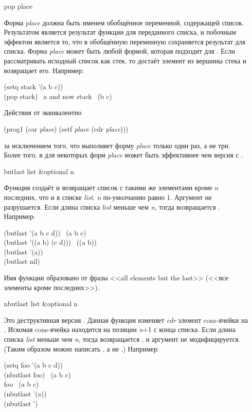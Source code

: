 \begin{defmac}
pop place

Форма \emph{place} должна быть именем обобщённое переменной, содержащей
список. Результатом  является результат  функции для
переданного списка, и побочным эффектом является то, что в обобщённую переменную
сохраняется результат  для списка.
Форма \emph{place} может быть любой формой, которая подходит для
. Если рассматривать исходный список как стек, то  достаёт
элемент из вершины стека и возвращает его.
Например:
\begin{lisp}
(setq stack '(a b c)) \\
(pop stack) \EV\ a  \textrm{and now} stack \EV\ (b c)
\end{lisp}
Действия от  эквивалентно
\begin{lisp}
(prog1 (car \emph{place}) (setf \emph{place} (cdr \emph{place})))
\end{lisp}
за исключением того, что  выполняет форму \emph{place} только один раз,
а не три.
Более того, в для некоторых форм \emph{place}  может быть
эффективнее чем версия с . 
\end{defmac}

\begin{defun}[Функция]
butlast list &optional n

Функция создаёт и возвращает список с такими же элементами кроме \emph{n}
последних, что и в списке \emph{list}.
\emph{n} по-умолчанию равно 1. Аргумент не разрушается.
Если длина списка \emph{list} меньше чем \emph{n}, тогда возвращается
{\emptylist}.
Например:
\begin{lisp}
(butlast '(a b c d)) \EV\ (a b c) \\
(butlast '((a b) (c d))) \EV\ ((a b)) \\
(butlast '(a)) \EV\ {\emptylist} \\
(butlast nil) \EV\ {\emptylist}
\end{lisp}
Имя функции образовано от фразы <<all elements but the last>> (<<все элементы
кроме последних>>).
\end{defun}

\begin{defun}[Функция]
nbutlast list &optional n

Это деструктивная версия . Данная функция изменяет \emph{cdr}
элемент cons-ячейки на {\nil}. Искомая cons-ячейка находится на позиции
\emph{n}+1 с конца списка. Если длина списка \emph{list} меньше чем \emph{n},
тогда возвращается {\emptylist}, и аргумент не модифицируется. (Таким образом
можно написать , а не .)
Например:
\begin{lisp}
(setq foo '(a b c d)) \\
(nbutlast foo) \EV\ (a b c) \\
foo \EV\ (a b c) \\
(nbutlast '(a)) \EV\ {\emptylist} \\
(nbutlast '{\nil}) \EV\ {\emptylist}
\end{lisp}
\end{defun}

